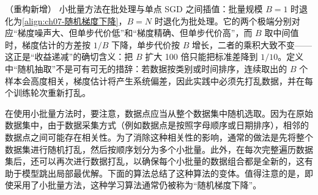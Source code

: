 \documentclass[../../main.tex]{subfiles}
\begin{document}
\begin{remark}（重构新增）
小批量方法在批处理与单点 SGD 之间插值：批量规模 $B=1$ 时退化为\eqref{align:ch07-随机梯度下降}，$B=N$ 时退化为批处理。它的两个极端分别对应“梯度噪声大、但单步代价低”和“梯度精确、但单步代价高”，而 $B$ 取中间值时，梯度估计的方差按 $1/B$ 下降，单步代价按 $B$ 增长，二者的乘积大致不变——这正是“收益递减”的确切含义：把 $B$ 扩大 100 倍只能把标准差降到 $1/10$。定义中“随机抽取”不是可有可无的措辞：若数据按类别或时间排序，连续取出的 $B$ 个样本会高度相关，梯度估计将产生系统偏差，因此实践中必须先打乱数据，并在每个训练轮次重新打乱。
\end{remark}

在使用小批量方法时，要注意，数据点应当从整个数据集中随机选取。因为在原始数据集中，由于数据采集方式（例如数据点是按照字母顺序或日期排序），相邻的数据点之间可能存在相关性。为了消除这种相关性的影响，通常的做法是先将整个数据集进行随机打乱，然后按顺序划分为多个小批量。此外，在每次完整遍历数据集后，还可以再次进行数据打乱，以确保每个小批量的数据组合都是全新的，这有助于模型跳出局部最优解。下面的算法总结了这种算法的变体。值得注意的是，即使采用了小批量方法，这种学习算法通常仍被称为“随机梯度下降”。
\end{document}
